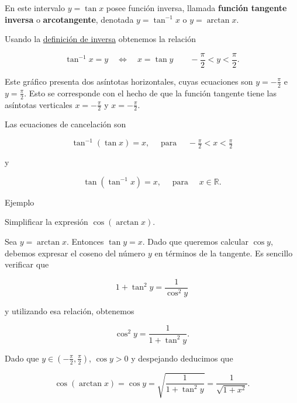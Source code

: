 \documentclass[
  letterpaper,
]{book}
\theoremstyle{plain}
\theoremstyle{remark}
\begin{document}
En este intervalo \(y=\tan x\) posee función inversa, llamada
\textbf{función tangente inversa} o \textbf{arcotangente}, denotada
\(y=\tan^{-1} x\) o \(y=\operatorname{arctan} x\).

Usando la \hyperref[eq-funcion_inversa]{definición de inversa} obtenemos
la relación

\[
\tan^{-1} x=y\quad\Longleftrightarrow\quad x=\tan y\qquad -\frac{\pi}{2}<y<\frac{\pi}{2}.
\]

Este gráfico presenta dos asíntotas horizontales, cuyas ecuaciones son
\(y=-\tfrac{\pi}{2}\) e \(y=\tfrac{\pi}{2}\). Esto se corresponde con el
hecho de que la función tangente tiene las asíntotas verticales
\(x=-\tfrac{\pi}{2}\) y \(x=-\tfrac{\pi}{2}\).

Las ecuaciones de cancelación son

\[
\tan^{-1}(\tan x)=x, \quad \text{ para }  \quad   -\tfrac{\pi}{2}< x<\tfrac{\pi}{2}
\]

y

\[
\tan(\tan^{-1} x)=x, \quad \text{ para } \quad x\in \mathbb{R}.
\]

Ejemplo

Simplificar la expresión \(\cos(\operatorname{arctan} x)\).

\begin{tcolorbox}[enhanced jigsaw, opacityback=0, left=2mm, opacitybacktitle=0.6, toprule=.15mm, bottomrule=.15mm, colbacktitle=quarto-callout-tip-color!10!white, titlerule=0mm, bottomtitle=1mm, title=\textcolor{quarto-callout-tip-color}{\faLightbulb}\hspace{0.5em}{Solución}, toptitle=1mm, colframe=quarto-callout-tip-color-frame, colback=white, breakable, rightrule=.15mm, arc=.35mm, leftrule=.75mm, coltitle=black]

Sea \(y=\operatorname{arctan} x\). Entonces \(\tan y =x\). Dado que
queremos calcular \(\cos y\), debemos expresar el coseno del número
\(y\) en términos de la tangente. Es sencillo verificar que

\[
1+\tan^2 y = \frac{1}{\cos^2 y}
\]

y utilizando esa relación, obtenemos

\[
\cos^2 y =\frac{1}{1+\tan^2 y}.
\]

Dado que \(y\in \left(-\frac{\pi}{2},\frac{\pi}{2}\right)\),
\(\cos y>0\) y despejando deducimos que

\[
\cos(\operatorname{arctan} x) = \cos y =\sqrt{\frac{1}{1+\tan^2 y}}=\frac{1}{\sqrt{1+x^2}}.
\]

\end{tcolorbox}
\end{document}
